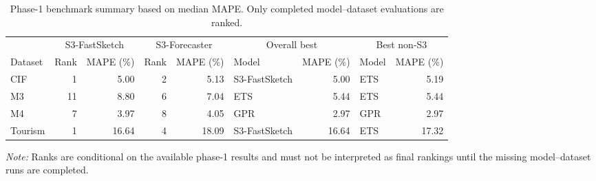 \begin{table}[t]
\centering
\caption{Phase-1 benchmark summary based on median MAPE. Only completed model--dataset evaluations are ranked.}
\label{tab:phase1_benchmark}
\footnotesize
\setlength{\tabcolsep}{4pt}
\begin{tabular}{lrrrrlrlr}
\toprule
& \multicolumn{2}{c}{S3-FastSketch} & \multicolumn{2}{c}{S3-Forecaster}
& \multicolumn{2}{c}{Overall best} & \multicolumn{2}{c}{Best non-S3} \\
\cmidrule(lr){2-3}\cmidrule(lr){4-5}\cmidrule(lr){6-7}\cmidrule(lr){8-9}
Dataset & Rank & MAPE (\%) & Rank & MAPE (\%) & Model & MAPE (\%) & Model & MAPE (\%) \\
\midrule
CIF & 1 & 5.00 & 2 & 5.13 & S3-FastSketch & 5.00 & ETS & 5.19 \\
M3 & 11 & 8.80 & 6 & 7.04 & ETS & 5.44 & ETS & 5.44 \\
M4 & 7 & 3.97 & 8 & 4.05 & GPR & 2.97 & GPR & 2.97 \\
Tourism & 1 & 16.64 & 4 & 18.09 & S3-FastSketch & 16.64 & ETS & 17.32 \\
\bottomrule
\end{tabular}
\begin{minipage}{0.98\textwidth}
\footnotesize\emph{Note:} Ranks are conditional on the available phase-1 results and must not be interpreted as final rankings until the missing model--dataset runs are completed.
\end{minipage}
\end{table}
